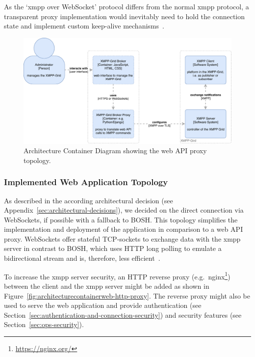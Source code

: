 As the `\gls{xmpp} over WebSocket' protocol differs from the normal \gls{xmpp} protocol, a transparent proxy implementation would inevitably need to hold the connection state and implement custom keep-alive mechanisms~\cite{rfc7395}.

\begin{figure}[H]
\centering
\includegraphics[width=0.8\linewidth]{resources/architecture_container_proxy}
\caption[Architecture Container Diagram: Web Proxy]{Architecture Container Diagram showing the web API proxy topology.}
\label{fig:architecturecontainerwebproxy}
\end{figure}

\subsubsection{Implemented Web Application Topology}\label{sec:implemented-web-application-topology}

As described in the according architectural decision (see Appendix~\ref{sec:architectural-decisions}), we decided on the direct connection via WebSockets, if possible with a fallback to BOSH.
This topology simplifies the implementation and deployment of the application in comparison to a web API proxy.
WebSockets offer stateful TCP-sockets to exchange data with the \gls{xmpp} server in contrast to BOSH, which uses HTTP long polling to emulate a bidirectional stream and is, therefore, less efficient~\cite{xep-0124}.

To increase the \gls{xmpp} server security, an HTTP reverse proxy (e.g.\ nginx\footnote{\url{https://nginx.org/}}) between the client and the \gls{xmpp} server might be added as shown in Figure~\ref{fig:architecturecontainerweb-http-proxy}.
The reverse proxy might also be used to serve the web application and provide authentication (see Section~\ref{sec:authentication-and-connection-security}) and security features (see Section~\ref{sec:ops-security}).


